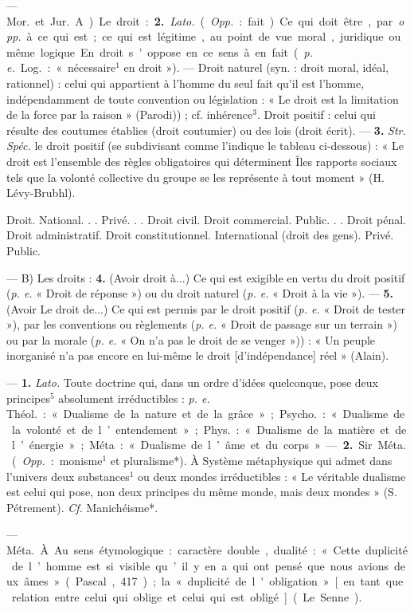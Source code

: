 \begin{itemize}[leftmargin=1cm, label=, itemsep=1pt]
 — \si{Mor.} et \si{Jur.} A) Le
droit : {\bf 2.} {\it Lato.} ({\it Opp.} : fait). Ce qui
doit être, par {\it opp.} à ce qui est; ce
qui est légitime, au point de vue
moral, juridique ou même logique.
En droit s’oppose en ce sens à en fait
({\it p. e.} \si{Log.} : « nécessaire$^1$ en droit »).
— Droit naturel (syn. : droit moral,
idéal, rationnel) : celui qui appartient
à l’homme du seul fait qu'il est
l’homme, indépendamment de toute
convention ou législation : « Le droit
est la limitation de la force par la
raison » (Parodi)) ; cf. inhérence$^3$. Droit
positif : celui qui résulte des coutumes établies (droit coutumier) ou
des lois (droit écrit). — {\bf 3.} {\it Str.} {\it Spéc.}
le droit positif (se subdivisant comme
l'indique le tableau ci-dessous) :
« Le droit est l’ensemble des règles
obligatoires qui déterminent Îles
rapports sociaux tels que la volonté
collective du groupe se les représente
à tout moment » (H. Lévy-Brubhl).

Droit.
 National. . .
  Privé. . .
   Droit civil.
   Droit commercial.
  Public. . .
   Droit pénal.
   Droit administratif.
   Droit constitutionnel.
 International (droit des gens).
  Privé.
  Public.

— B) Les droits : {\bf 4.} (Avoir droit
à...) Ce qui est exigible en vertu
du droit positif ({\it p. e.} « Droit de réponse ») ou du droit naturel ({\it p. e.}
« Droit à la vie »). — {\bf 5.} (Avoir Le
droit de...) Ce qui est permis par le
droit positif ({\it p. e.} « Droit de tester »),
par les conventions ou règlements
({\it p. e.} « Droit de passage sur un terrain ») ou par la morale ({\it p. e.} « On
n’a pas le droit de se venger »)) : « Un
peuple inorganisé n’a pas encore en
lui-même le droit [d'indépendance]
réel » (Alain).

 — {\bf 1.} {\it Lato.} Toute doctrine
qui, dans un ordre d'idées quelconque, pose deux principes$^5$ absolument irréductibles : {\it p. e.} \si{Théol.} :
« Dualisme de la nature et de la
grâce » ; \si{Psycho.} : « Dualisme de la
volonté et de l’entendement » ;
\si{Phys.} : « Dualisme de la matière et
de l’énergie » ; Méta : « Dualisme de
l’âme et du corps ».

— {\bf 2.} Sir. \si{Méta.} ({\it Opp.} : monisme$^1$
et pluralisme*). À Système métaphysique qui admet dans l’univers deux
substances$^1$ ou deux mondes irréductibles : « Le véritable dualisme
est celui qui pose, non deux principes du même monde, mais deux
mondes » (S. Pétrement). {\it Cf.} Manichéisme*.

 — \si{Méta.} À. Au sens étymologique : caractère double, dualité :
« Cette duplicité de l’homme est si
visible qu’il y en a qui ont pensé
que nous avions deux âmes » (Pascal,
417); la « duplicité de l'obligation »
[en tant que relation entre celui qui
oblige et celui qui est obligé] (Le
Senne).


\end{itemize}
